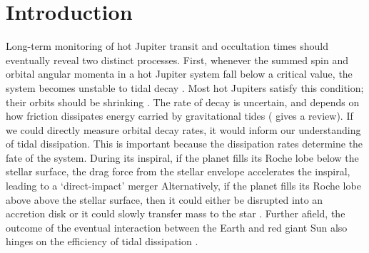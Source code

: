 \documentclass[12pt,twocolumn,tighten]{aastex62}
\begin{document}

\section{Introduction}
\label{sec:intro}

Long-term monitoring of hot Jupiter transit and occultation times
should eventually reveal two distinct processes.  First, whenever the
summed spin and orbital angular momenta in a hot Jupiter system fall
below a critical value, the system becomes unstable to tidal decay
\citep{counselman_outcomes_1973,hut_stability_1980}.  Most hot
Jupiters satisfy this condition; their orbits should be shrinking
\citep{levrard_falling_2009,matsumura_tidal_2010}.  The rate of decay
is uncertain, and depends on how friction dissipates energy carried by
gravitational tides (\citealt{ogilvie_tidal_2014} gives a review).  If
we could directly measure orbital decay rates, it would inform our
understanding of tidal dissipation.  This is important because the
dissipation rates determine the fate of the system.  During its
inspiral, if the planet fills its Roche lobe below the stellar
surface, the drag force from the stellar envelope accelerates the
inspiral, leading to a `direct-impact' merger
\citep{metzger_optical_2012,macleod_planetary_2018} Alternatively, if
the planet fills its Roche lobe above above the stellar surface, then
it could either be disrupted into an accretion disk or it could slowly
transfer mass to the star
\citep{metzger_optical_2012,valsecchi_tidally-driven_2015,jackson_tidal_2016}.
Further afield, the outcome of the eventual interaction between the
Earth and red giant Sun also hinges on the efficiency of tidal
dissipation \citep{rasio_tidal_1996}.
\end{document}
